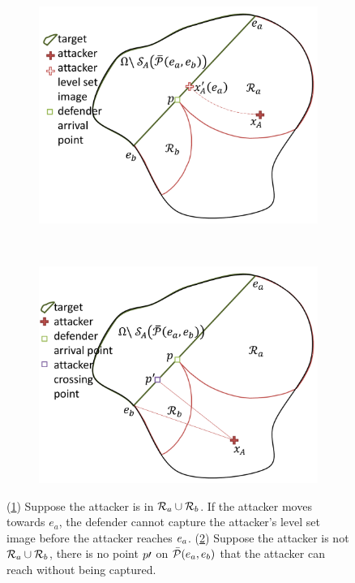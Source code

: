 \begin{figure}[h]
\centering
	\begin{subfigure}{0.24\textwidth}
	\centering
	\includegraphics[width=\textwidth]{"fig/attacker in Ra"}
	\caption{\label{subfig:ainra}}
	\end{subfigure}~
	\begin{subfigure}{0.24\textwidth}
	\centering
	\includegraphics[width=\textwidth]{"fig/attacker outside Ra U Rb"}
	\caption{\label{subfig:aoutra}}
	\end{subfigure}
\caption{(\ref{subfig:ainra}) Suppose the attacker is in $\mathcal{R}_a\cup\mathcal{R}_b$. If the attacker moves towards $e_a$, the defender cannot capture the attacker's level set image before the attacker reaches $e_a$. (\ref{subfig:aoutra}) Suppose the attacker is not $\mathcal{R}_a\cup\mathcal{R}_b$, there is no point $p\prime$ on $\bar{\mathcal{P}}(e_a,e_b)$ that the attacker can reach without being captured.}
\label{fig:lemma1}
\end{figure}

